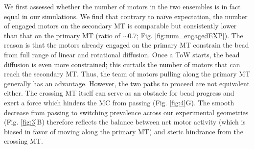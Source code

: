 We first assessed whether the number of motors in the two ensembles is in fact equal in our simulations. We find that contrary to na\"ive expectation, the number of engaged motors on the secondary MT is comparable but consistently lower than that on the primary MT (ratio of $\sim$0.7; Fig. \ref{fig:num_engagedEXP}). The reason is that the motors already engaged on the primary MT constrain the bead from full range of linear and rotational diffusion. Once a ToW starts, the bead diffusion is even more constrained; this curtails the number of motors that can reach the secondary MT. Thus, the team of motors pulling along the primary MT generally has an advantage. However, the two paths to proceed are not equivalent either. The crossing MT itself can serve as an obstacle for bead progress and exert a force which hinders the MC from passing (Fig. \ref{fig:4}G). The smooth decrease from passing to switching prevalence across our experimental geometries (Fig. \ref{fig:3}B) therefore reflects the balance between net motor activity (which is biased in favor of moving along the primary MT) and steric hindrance from the crossing MT.

